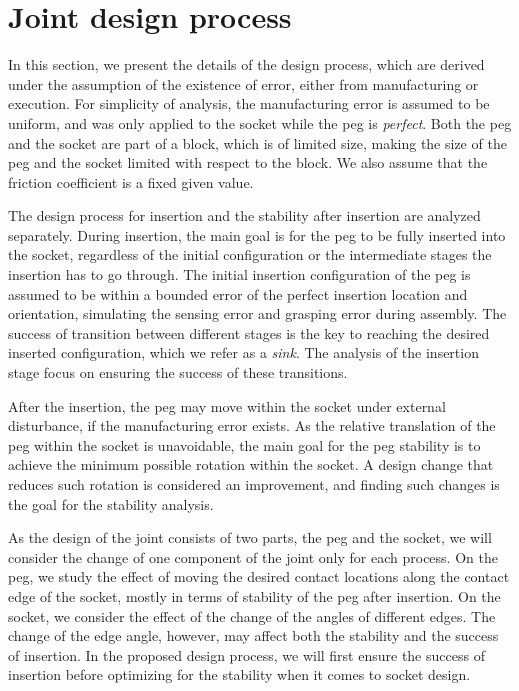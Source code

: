 \documentclass[letterpaper, 10 pt, conference]{ieeeconf}
\begin{document}
\section{Joint design process}
\label{sec:design}


In this section, we present the details of the design process, which are derived under the assumption of the existence of error, either from manufacturing or execution. For simplicity of analysis, the manufacturing error is assumed to be uniform, and was only applied to the socket while the peg is {\em perfect}. Both the peg and the socket are part of a block, which is of limited size, making the size of the peg and the socket limited with respect to the block. We also assume that the friction coefficient is a fixed given value. 

The design process for insertion and the stability after insertion are analyzed separately. During insertion, the main goal is for the peg to be fully inserted into the socket, regardless of the initial configuration or the intermediate stages the insertion has to go through. The initial insertion configuration of the peg is assumed to be within a bounded error of the perfect insertion location and orientation, simulating the sensing error and grasping error during assembly. The success of transition between different stages is the key to reaching the desired inserted configuration, which we refer as a {\em sink}. The analysis of the insertion stage focus on ensuring the success of these transitions. 

After the insertion, the peg may move within the socket under external disturbance, if the manufacturing error exists. As the relative translation of the peg within the socket is unavoidable, the main goal for the peg stability is to achieve the minimum possible rotation within the socket. A design change that reduces such rotation is considered an improvement, and finding such changes is the goal for the stability analysis. 

As the design of the joint consists of two parts, the peg and the socket, we will consider the change of one component of the joint only for each process. On the peg, we study the effect of moving the desired contact locations along the contact edge of the socket, mostly in terms of stability of the peg after insertion. On the socket, we consider the effect of the change of the angles of different edges. The change of the edge angle, however, may affect both the stability and the success of insertion. In the proposed design process, we will first ensure the success of insertion before optimizing for the stability when it comes to socket design. 
\end{document}
